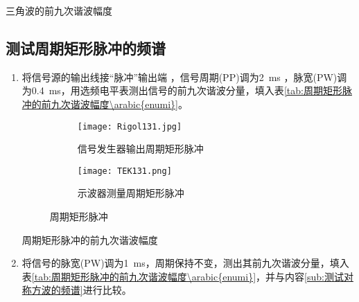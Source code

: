 \begin{table}[htpb]
	\centering
	\caption{三角波的前九次谐波幅度}
	\label{tab:三角波的前九次谐波幅度}
\end{table}

\subsection{测试周期矩形脉冲的频谱}%
\label{sub:测试周期矩形脉冲的频谱}

\begin{enumerate}
	\item 将信号源的输出线接“脉冲”输出端 ，信号周期(PP)调为\SI{2}{ms} ，脉宽(PW)调为\SI{0.4}{ms}，用选频电平表测出信号的前九次谐波分量，填入表\ref{tab:周期矩形脉冲的前九次谐波幅度\arabic{enumi}}。

		\begin{figure}[htpb]
			\centering
			\begin{subfigure}[htpb]{.45\linewidth}
				\centering
				\texttt{[image: Rigol131.jpg]}
				\caption{信号发生器输出周期矩形脉冲}
				\label{fig:信号发生器输出周期矩形脉冲\arabic{enumi}}
			\end{subfigure}
			\quad
			\begin{subfigure}[htpb]{.45\linewidth}
				\centering
				\texttt{[image: TEK131.png]}
				\caption{示波器测量周期矩形脉冲}
				\label{fig:示波器测量周期矩形脉冲\arabic{enumi}}
			\end{subfigure}
			\caption{周期矩形脉冲}
			\label{fig:周期矩形脉冲\arabic{enumi}}
		\end{figure}

		\begin{table}[htpb]
			\centering
			\caption{周期矩形脉冲的前九次谐波幅度}
			\label{tab:周期矩形脉冲的前九次谐波幅度\arabic{enumi}}
		\end{table}

	\item 将信号的脉宽(PW)调为\SI{1}{ms}，周期保持不变，测出其前九次谐波分量，填入表\ref{tab:周期矩形脉冲的前九次谐波幅度\arabic{enumi}}，并与内容\ref{sub:测试对称方波的频谱}进行比较。


\end{enumerate}
